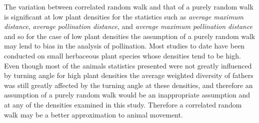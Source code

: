 The variation between correlated random walk and that of a purely random walk is
significant at low plant densities for the statistics such as \emph{average
maximum distance}, \emph{average pollination distance}, and \emph{average
maximum pollination distance} and so for the case of low plant densities the
assumption of a purely random walk may lend to bias in the analysis of
pollination. Most studies to date have been conducted on small herbaceous plant
species whose densities tend to be high. Even though most of the animals
statistics presented were not greatly influenced by turning angle for high plant
densities the average weighted diversity of fathers was still greatly affected
by the turning angle at these densities, and therefore an assumption of a purely
random walk would be an inappropriate assumption and at any of the densities
examined in this study. Therefore a correlated random walk may be a better
approximation to animal movement.

